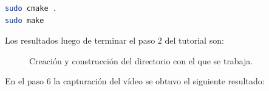 \documentclass[letterpaper,12pt]{article}
\begin{document}
\begin{lstlisting}[language=bash, frame=single]
sudo cmake .
sudo make 
\end{lstlisting}
 
 Los resultados luego de terminar el paso 2 del tutorial son:
 
\begin{figure}[H]
\centering
{}
\caption{Creación y construcción del directorio con el que se trabaja.}
\label{Fig:Paso2Turto}
\end{figure}
 
 En el paso 6 la capturación del vídeo se obtuvo el siguiente resultado:
 
\end{document}
